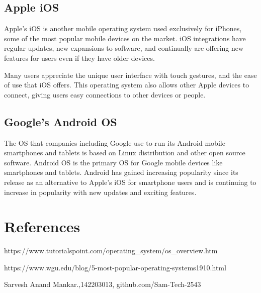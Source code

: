 \documentclass[12pt]{article}
\begin{document}
\subsection{Apple iOS}
Apple's iOS is another mobile operating system used exclusively for iPhones, some of the most popular mobile devices on the market. iOS integrations have regular updates, new expansions to software, and continually are offering new features for users even if they have older devices. ~\cite{[2]}

Many users appreciate the unique user interface with touch gestures, and the ease of use that iOS offers. This operating system also allows other Apple devices to connect, giving users easy connections to other devices or people.

\subsection{Google's Android OS}
The OS that companies including Google use to run its Android mobile smartphones and tablets is based on Linux distribution and other open source software. Android OS is the primary OS for Google mobile devices like smartphones and tablets. Android has gained increasing popularity since its release as an alternative to Apple’s iOS for smartphone users and is continuing to increase in popularity with new updates and exciting features.~\cite{[3]}

\clearpage

\section{References}
\begin{thebibliography} {}

 https://www.tutorialspoint.com/operating\_system/os\_overview.htm

 https://www.wgu.edu/blog/5-most-popular-operating-systems1910.html

 Sarvesh Anand Mankar.,142203013, github.com/Sam-Tech-2543

\end{thebibliography} 

\printbibliography 
\end{document}

